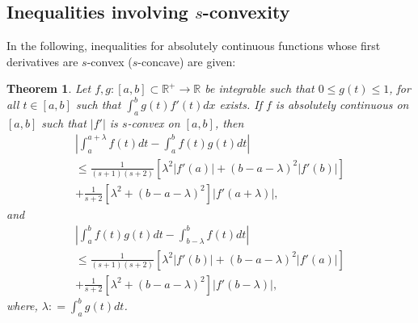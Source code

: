 \documentclass{amsart}
\newtheorem{theorem}{Theorem}
\theoremstyle{plain}
\numberwithin{equation}{section}
\begin{document}
\subsection{Inequalities involving $s$-convexity}
In the following, inequalities for absolutely continuous functions
whose first derivatives are $s$-convex ($s$-concave) are given:
\begin{theorem}
\label{thm.main1}Let $f,g: [a,b]\subset \mathbb{R}^{+} \to
\mathbb{R}$ be integrable such that $0 \le g(t) \le 1$, for all $t
\in [a,b]$ such that $\int_a^b {g\left( t \right)f'\left( t
\right)dx}$ exists. If $f$ is absolutely continuous on $[a,b]$
such that $|f'|$ is $s$-convex on $[a,b]$, then
\begin{multline}
\label{eq2.3}\left| {\int_a^{a + \lambda } {f\left( t \right)dt -
\int_a^b {f\left( t \right)g\left( t \right)dt} } } \right|
\\
\le \frac{1}{{\left( {s + 1} \right)\left( {s + 2} \right)}}\left[
{\lambda ^{ 2} \left| {f'\left( a \right)} \right| + \left( {b - a
- \lambda } \right)^{2} \left| {f'\left( b \right)} \right|}
\right]
\\
+ \frac{1}{{s + 2}}\left[ {\lambda ^{ 2}  + \left( {b - a -
\lambda } \right)^{ 2} } \right]\left| {f'\left( {a + \lambda }
\right)} \right|,
\end{multline}
and
\begin{multline}
\label{eq2.4}\left| {\int_a^b {f\left( t \right)g\left( t
\right)dt}  - \int_{b - \lambda }^b {f\left( t \right)dt} }
\right|
\\
\le \frac{1}{{\left( {s + 1} \right)\left( {s + 2} \right)}}\left[
{\lambda ^{ 2} \left| {f'\left( b \right)} \right| + \left( {b - a
- \lambda } \right)^{2} \left| {f'\left( a \right)} \right|}
\right]
\\
+ \frac{1}{{s + 2}}\left[ {\lambda ^{ 2}  + \left( {b - a -
\lambda } \right)^{2} } \right]\left| {f'\left( {b - \lambda }
\right)} \right|,
\end{multline}
where, $\lambda : = \int_a^b {g\left( t \right)dt}$.
\end{theorem}
\end{document}
